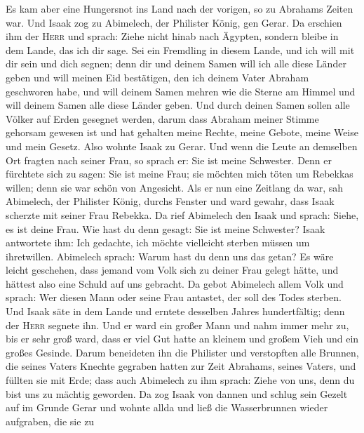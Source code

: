  Es kam aber eine Hungersnot ins Land nach der vorigen, so
zu Abrahams Zeiten war. Und Isaak zog zu Abimelech, der Philister König,
gen Gerar.  Da erschien ihm der \textsc{Herr} und sprach:
Ziehe nicht hinab nach Ägypten, sondern bleibe in dem Lande, das ich dir
sage.  Sei ein Fremdling in diesem Lande, und ich will mit
dir sein und dich segnen; denn dir und deinem Samen will ich alle diese
Länder geben und will meinen Eid bestätigen, den ich deinem Vater
Abraham geschworen habe,  und will deinem Samen mehren wie
die Sterne am Himmel und will deinem Samen alle diese Länder geben. Und
durch deinen Samen sollen alle Völker auf Erden gesegnet werden,
 darum dass Abraham meiner Stimme gehorsam gewesen ist und
hat gehalten meine Rechte, meine Gebote, meine Weise und mein Gesetz.
 Also wohnte Isaak zu Gerar.  Und wenn die
Leute an demselben Ort fragten nach seiner Frau, so sprach er: Sie ist
meine Schwester. Denn er fürchtete sich zu sagen: Sie ist meine Frau;
sie möchten mich töten um Rebekkas willen; denn sie war schön von
Angesicht.  Als er nun eine Zeitlang da war, sah
Abimelech, der Philister König, durchs Fenster und ward gewahr, dass
Isaak scherzte mit seiner Frau Rebekka.  Da rief Abimelech
den Isaak und sprach: Siehe, es ist deine Frau. Wie hast du denn gesagt:
Sie ist meine Schwester? Isaak antwortete ihm: Ich gedachte, ich möchte
vielleicht sterben müssen um ihretwillen.  Abimelech
sprach: Warum hast du denn uns das getan? Es wäre leicht geschehen, dass
jemand vom Volk sich zu deiner Frau gelegt hätte, und hättest also eine
Schuld auf uns gebracht.  Da gebot Abimelech allem Volk
und sprach: Wer diesen Mann oder seine Frau antastet, der soll des Todes
sterben.  Und Isaak säte in dem Lande und erntete
desselben Jahres hundertfältig; denn der \textsc{Herr} segnete ihn.
 Und er ward ein großer Mann und nahm immer mehr zu, bis
er sehr groß ward,  dass er viel Gut hatte an kleinem und
großem Vieh und ein großes Gesinde. Darum beneideten ihn die Philister
 und verstopften alle Brunnen, die seines Vaters Knechte
gegraben hatten zur Zeit Abrahams, seines Vaters, und füllten sie mit
Erde;  dass auch Abimelech zu ihm sprach: Ziehe von uns,
denn du bist uns zu mächtig geworden.  Da zog Isaak von
dannen und schlug sein Gezelt auf im Grunde Gerar und wohnte allda
 und ließ die Wasserbrunnen wieder aufgraben, die sie zu
